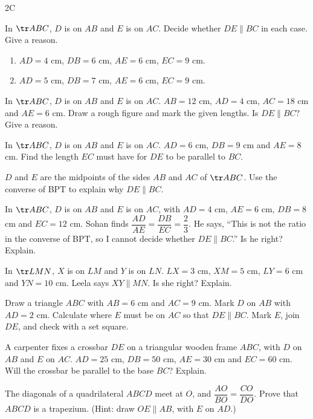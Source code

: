 \begin{exercise}{2C}
  \item In $\tr ABC$, $D$ is on $AB$ and $E$ is on $AC$. Decide whether $DE\parallel BC$ in each case. Give a reason.
  \begin{enumerate}[label=(\alph*),itemsep=1pt]
    \item $AD=4$ cm, $DB=6$ cm, $AE=6$ cm, $EC=9$ cm.
    \item $AD=5$ cm, $DB=7$ cm, $AE=6$ cm, $EC=9$ cm.
  \end{enumerate}
  \item In $\tr ABC$, $D$ is on $AB$ and $E$ is on $AC$. $AB=12$ cm, $AD=4$ cm, $AC=18$ cm and $AE=6$ cm. Draw a rough figure and mark the given lengths. Is $DE\parallel BC$? Give a reason.
  \item In $\tr ABC$, $D$ is on $AB$ and $E$ is on $AC$. $AD=6$ cm, $DB=9$ cm and $AE=8$ cm. Find the length $EC$ must have for $DE$ to be parallel to $BC$.
  \item $D$ and $E$ are the midpoints of the sides $AB$ and $AC$ of $\tr ABC$. Use the converse of BPT to explain why $DE\parallel BC$.
  \item In $\tr ABC$, $D$ is on $AB$ and $E$ is on $AC$, with $AD=4$ cm, $AE=6$ cm, $DB=8$ cm and $EC=12$ cm. Sohan finds $\dfrac{AD}{AE}=\dfrac{DB}{EC}=\dfrac23$. He says, ``This is not the ratio in the converse of BPT, so I cannot decide whether $DE\parallel BC$.'' Is he right? Explain.
  \item In $\tr LMN$, $X$ is on $LM$ and $Y$ is on $LN$. $LX=3$ cm, $XM=5$ cm, $LY=6$ cm and $YN=10$ cm. Leela says $XY\parallel MN$. Is she right? Explain.
  \item Draw a triangle $ABC$ with $AB=6$ cm and $AC=9$ cm. Mark $D$ on $AB$ with $AD=2$ cm. Calculate where $E$ must be on $AC$ so that $DE\parallel BC$. Mark $E$, join $DE$, and check with a set square.
  \item A carpenter fixes a crossbar $DE$ on a triangular wooden frame $ABC$, with $D$ on $AB$ and $E$ on $AC$. $AD=25$ cm, $DB=50$ cm, $AE=30$ cm and $EC=60$ cm. Will the crossbar be parallel to the base $BC$? Explain.
  \item The diagonals of a quadrilateral $ABCD$ meet at $O$, and $\dfrac{AO}{BO}=\dfrac{CO}{DO}$. Prove that $ABCD$ is a trapezium. (Hint: draw $OE\parallel AB$, with $E$ on $AD$.)
  \begin{center}
\end{center}
\end{exercise}
